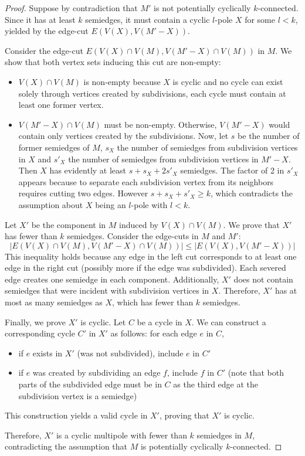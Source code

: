 \documentclass[12pt, twoside]{book}
\begin{document}
\begin{proof}
	Suppose by contradiction that $M'$ is not potentially cyclically $k$-connected. Since it has at least $k$ semiedges, it must contain a cyclic $l$-pole $X$ for some $l<k$, yielded by the edge-cut $E\left(V(X),V(M'-X)\right)$.
	
	Consider the edge-cut $E\left(V(X)\cap V(M), V(M'-X)\cap V(M)\right)$ in $M$. We show that both vertex sets inducing this cut are non-empty:
	\begin{itemize}
		\item $V(X)\cap V(M)$ is non-empty because $X$ is cyclic and no cycle can exist solely through vertices created by subdivisions, each cycle must contain at least one former vertex.
		\item $V(M'-X)\cap V(M)$ must be non-empty. Otherwise, $V(M'-X)$ would contain only vertices created by the subdivisions. Now, let $s$ be the number of former semiedges of $M$, $s_X$ the number of semiedges from subdivision vertices in $X$ and $s'_X$ the number of semiedges from subdivision vertices in $M'-X$. Then $X$ has evidently at least $s+s_X+2s'_X$ semiedges. The factor of 2 in $s'_X$ appears because to separate each subdivision vertex from its neighbors requires cutting two edges. However $s+s_X+s'_X\geq k$, which contradicts the assumption about $X$ being an $l$-pole with $l<k$.
	\end{itemize}
	
	Let $X'$ be the component in $M$ induced by $V(X)\cap V(M)$. We prove that $X'$ has fewer than $k$ semiedges. Consider the edge-cuts in $M$ and $M'$:
	$$\left|E\left(V(X)\cap V(M), V(M'-X)\cap V(M)\right)\right|\leq \left|E\left(V(X),V(M'-X)\right)\right|$$
	This inequality holds because any edge in the left cut corresponds to at least one edge in the right cut (possibly more if the edge was subdivided). Each severed edge creates one semiedge in each component. Additionally, $X'$ does not contain semiedges that were incident with subdivision vertices in $X$. Therefore, $X'$ has at most as many semiedges as $X$, which has fewer than $k$ semiedges.
	
	Finally, we prove $X'$ is cyclic. Let $C$ be a cycle in $X$. We can construct a corresponding cycle $C'$ in $X'$ as follows: for each edge $e$ in $C$,
	\begin{itemize}
		\item if $e$ exists in $X'$ (was not subdivided), include $e$ in $C'$
		\item if $e$ was created by subdividing an edge $f$, include $f$ in $C'$ (note that both parts of the subdivided edge must be in $C$ as the third edge at the subdivision vertex is a semiedge)
	\end{itemize}
	This construction yields a valid cycle in $X'$, proving that $X'$ is cyclic.
	
	Therefore, $X'$ is a cyclic multipole with fewer than $k$ semiedges in $M$, contradicting the assumption that $M$ is potentially cyclically $k$-connected.
\end{proof}
\end{document}
